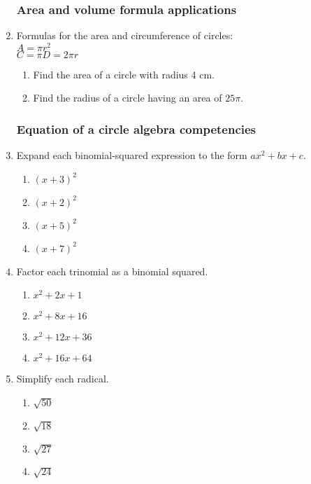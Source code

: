 \documentclass[12pt, twoside]{article}
\begin{document}
\begin{enumerate}
\subsubsection*{Area and volume formula applications}

  \item Formulas for the area and circumference of circles:\\
  $A=\pi r^2$\\
  $C=\pi D = 2\pi r$
    \begin{enumerate}
    \item Find the area of a circle with radius 4 cm.
    \item Find the radius of a circle having an area of $25 \pi$.
    \end{enumerate}

\newpage
\subsubsection*{Equation of a circle algebra competencies} 

  \item Expand each binomial-squared expression to the form $ax^2+bx+c$.
  \begin{multicols}{2}
  \begin{enumerate}[itemsep=2cm]
    \item $(x+3)^2$
    \item $(x+2)^2$ 
    \item $(x+5)^2$ 
    \item $(x+7)^2$ 
  \end{enumerate}
  \end{multicols}\vspace{2cm}

  \item Factor each trinomial as a binomial squared.
  \begin{multicols}{2}
    \begin{enumerate}[itemsep=2cm]
      \item $x^2+2x+1$ 
      \item $x^2+8x+16$
      \item $x^2+12x+36$ 
      \item $x^2+16x+64$ 
    \end{enumerate}
    \end{multicols}\vspace{2cm}

  \item Simplify each radical.
  \begin{multicols}{2}
    \begin{enumerate}[itemsep=2cm]
      \item $\sqrt{50}$ 
      \item $\sqrt{18}$
      \item $\sqrt{27}$ 
      \item $\sqrt{24}$ 
    \end{enumerate}
    \end{multicols}\vspace{2cm}
    

\end{enumerate}
\end{document}
